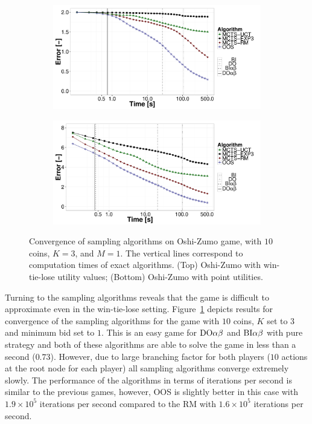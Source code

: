 \begin{figure}[t!]
\centering
	\begin{subfigure}{0.85\textwidth}
		\includegraphics[width=1\textwidth]{figures/convergence-oz.pdf}
	\end{subfigure}
	\begin{subfigure}{0.85\textwidth}
		\includegraphics[width=1\textwidth]{figures/convergence-oz-bf.pdf}
	\end{subfigure}
\caption{Convergence of sampling algorithms on Oshi-Zumo game, with $10$ coins, $K=3$, and $M=1$. The vertical lines correspond to computation times of exact algorithms.
(Top) Oshi-Zumo with win-tie-lose utility values;
(Bottom) Oshi-Zumo with point utilities.} \label{fig:off:conv:oz}
\end{figure}

Turning to the sampling algorithms reveals that the game is difficult to approximate even in the win-tie-lose setting.
Figure~\ref{fig:off:conv:oz} depicts results for convergence of the sampling algorithms for the game with $10$ coins, $K$ set to $3$ and minimum bid set to $1$. This is an easy game for $\textrm{DO}\alpha\beta$ and $\textrm{BI}\alpha\beta$ with pure strategy and both of these algorithms are able to solve the game in less than a second ($0.73$). However, due to large branching factor for both players ($10$ actions at the root node for each player) all sampling algorithms converge extremely slowly. The performance of the algorithms in terms of iterations per second is similar to the previous games, however, OOS is slightly better in this case with $1.9\times10^5$ iterations per second compared to the RM with $1.6\times10^5$ iterations per second.

